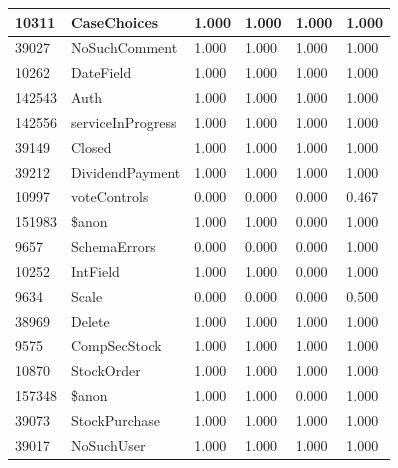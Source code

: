 \documentclass[a4paper]{article}
\newlength{\DUtablewidth} %
\begin{document}
\begin{longtable*}[c]{|p{0.160\DUtablewidth}|p{0.160\DUtablewidth}|p{0.160\DUtablewidth}|p{0.160\DUtablewidth}|p{0.160\DUtablewidth}|p{0.160\DUtablewidth}|}
10311
 & 
CaseChoices
 & 
1.000
 & 
1.000
 & 
1.000
 & 
1.000
 \\
\hline

39027
 & 
NoSuchComment
 & 
1.000
 & 
1.000
 & 
1.000
 & 
1.000
 \\
\hline

10262
 & 
DateField
 & 
1.000
 & 
1.000
 & 
1.000
 & 
1.000
 \\
\hline

142543
 & 
Auth
 & 
1.000
 & 
1.000
 & 
1.000
 & 
1.000
 \\
\hline

142556
 & 
serviceInProgress
 & 
1.000
 & 
1.000
 & 
1.000
 & 
1.000
 \\
\hline

39149
 & 
Closed
 & 
1.000
 & 
1.000
 & 
1.000
 & 
1.000
 \\
\hline

39212
 & 
DividendPayment
 & 
1.000
 & 
1.000
 & 
1.000
 & 
1.000
 \\
\hline

10997
 & 
voteControls
 & 
0.000
 & 
0.000
 & 
0.000
 & 
0.467
 \\
\hline

151983
 & 
\$anon
 & 
1.000
 & 
1.000
 & 
0.000
 & 
1.000
 \\
\hline

9657
 & 
SchemaErrors
 & 
0.000
 & 
0.000
 & 
0.000
 & 
1.000
 \\
\hline

10252
 & 
IntField
 & 
1.000
 & 
1.000
 & 
0.000
 & 
1.000
 \\
\hline

9634
 & 
Scale
 & 
0.000
 & 
0.000
 & 
0.000
 & 
0.500
 \\
\hline

38969
 & 
Delete
 & 
1.000
 & 
1.000
 & 
1.000
 & 
1.000
 \\
\hline

9575
 & 
CompSecStock
 & 
1.000
 & 
1.000
 & 
1.000
 & 
1.000
 \\
\hline

10870
 & 
StockOrder
 & 
1.000
 & 
1.000
 & 
1.000
 & 
1.000
 \\
\hline

157348
 & 
\$anon
 & 
1.000
 & 
1.000
 & 
0.000
 & 
1.000
 \\
\hline

39073
 & 
StockPurchase
 & 
1.000
 & 
1.000
 & 
1.000
 & 
1.000
 \\
\hline

39017
 & 
NoSuchUser
 & 
1.000
 & 
1.000
 & 
1.000
 & 
1.000
 \\
\hline


\end{longtable*}
\end{document}
